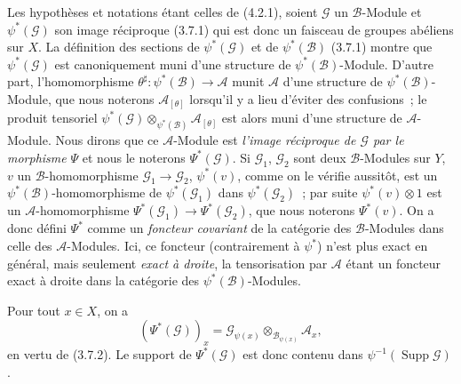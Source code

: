 \begin{env}[4.3.1]
\label{0.4.3.1-fr}
Les hypothèses et notations étant celles de (4.2.1), soient $\mathcal{G}$ un
$\mathcal{B}$-Module et $\psi^*(\mathcal{G})$ son image réciproque (3.7.1)
qui est donc un faisceau de groupes abéliens sur $X$. La définition des
sections de $\psi^*(\mathcal{G})$ et de $\psi^*(\mathcal{B})$ (3.7.1)
montre que $\psi^*(\mathcal{G})$ est canoniquement muni d'une structure de
$\psi^*(\mathcal{B})$-Module. D'autre part, l'homomorphisme
$\theta^\sharp:\psi^*(\mathcal{B})\to\mathcal{A}$ munit $\mathcal{A}$ d'une
structure de $\psi^*(\mathcal{B})$-Module, que nous noterons
$\mathcal{A}_{[\theta]}$ lorsqu'il y a lieu d'éviter des confusions~; le
produit tensoriel
$\psi^*(\mathcal{G})\otimes_{\psi^*(\mathcal{B})}\mathcal{A}_{[\theta]}$
est alors muni d'une structure de $\mathcal{A}$-Module. Nous dirons que ce
$\mathcal{A}$-Module est \emph{l'image
réciproque de $\mathcal{G}$ par le morphisme}
$\Psi$ et nous le noterons $\Psi^*(\mathcal{G})$. Si $\mathcal{G}_1$,
$\mathcal{G}_2$ sont deux $\mathcal{B}$-Modules sur $Y$, $v$ un
$\mathcal{B}$-homomorphisme $\mathcal{G}_1\to\mathcal{G}_2$,
$\psi^*(v)$, comme on le vérifie aussitôt, est un
$\psi^*(\mathcal{B})$-homomorphisme de $\psi^*(\mathcal{G}_1)$ dans
$\psi^*(\mathcal{G}_2)$~; par suite $\psi^*(v)\otimes1$ est un
$\mathcal{A}$-homomorphisme $\Psi^*(\mathcal{G}_1)\to\Psi^*(\mathcal{G}_2)$,
que nous noterons $\Psi^*(v)$. On a donc défini $\Psi^*$ comme un
\emph{foncteur covariant} de la catégorie des $\mathcal{B}$-Modules dans celle
des $\mathcal{A}$-Modules. Ici, ce foncteur (contrairement à $\psi^*$) n'est
plus exact en général, mais seulement \emph{exact à droite}, la tensorisation
par $\mathcal{A}$ étant un foncteur exact à droite dans la catégorie des
$\psi^*(\mathcal{B})$-Modules.

Pour tout $x\in X$, on a
\[
  (\Psi^*(\mathcal{G}))_x
  =\mathcal{G}_{\psi(x)}\otimes_{\mathcal{B}_{\psi(x)}}\mathcal{A}_x,
\]
en vertu de (3.7.2). Le support de $\Psi^*(\mathcal{G})$ est donc contenu dans
$\psi^{-1}(\operatorname{Supp}\mathcal{G})$.
\end{env}

